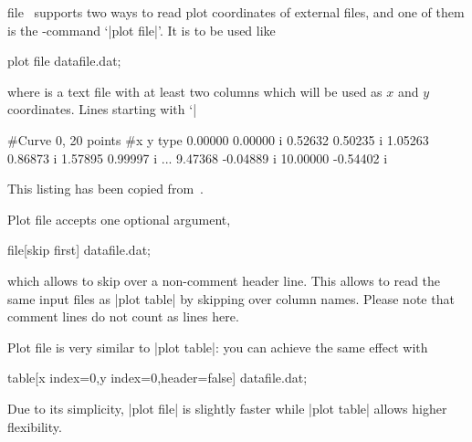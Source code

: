 \begin{addplotoperation}[]{file}{}
\PGFPlots\ supports two ways to read plot coordinates of external files, and one of them is the \Tikz-command `|plot file|'. It is to be used like
\begin{codeexample}
\addplot plot file {datafile.dat};
\end{codeexample}
where  is a text file with at least two columns which will be used as $x$ and $y$ coordinates. Lines starting with `|%
\begin{codeexample}
#Curve 0, 20 points
#x y type
0.00000 0.00000 i
0.52632 0.50235 i
1.05263 0.86873 i
1.57895 0.99997 i
...
9.47368 -0.04889 i
10.00000 -0.54402 i
\end{codeexample}
This listing has been copied from~\cite[section~16.4]{tikz}.

Plot file accepts one optional argument,

\begin{codeexample}
\addplot file[skip first] {datafile.dat};
\end{codeexample}

\noindent
which allows to skip over a non-comment header line. This allows to read the same input files as |plot table| by skipping over column names. Please note that comment lines do not count as lines here.

Plot file is very similar to |plot table|: you can achieve the same effect with
\begin{codeexample}
\addplot table[x index=0,y index=0,header=false] {datafile.dat};
\end{codeexample}
\noindent Due to its simplicity, |plot file| is slightly faster while |plot table| allows higher flexibility.
\end{addplotoperation}

